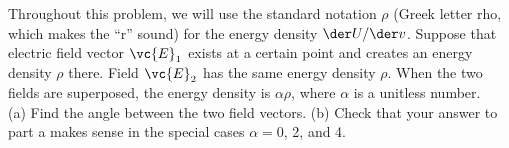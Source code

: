 Throughout this problem, we will use the standard notation $\rho$ (Greek letter rho,
which makes the ``r'' sound) for the energy density $\der U/\der v$.
Suppose that electric field vector $\vc{E}_1$ exists at a certain point
and creates an energy density $\rho$ there. Field $\vc{E}_2$ has the same
energy density $\rho$. When the two fields are superposed, the energy density
is $\alpha\rho$, where $\alpha$ is a unitless number. \\
(a) Find the angle between the two field vectors.\answercheck\hwendpart
(b) Check that your answer to part a makes sense in the special cases $\alpha=0$,
2, and 4.
